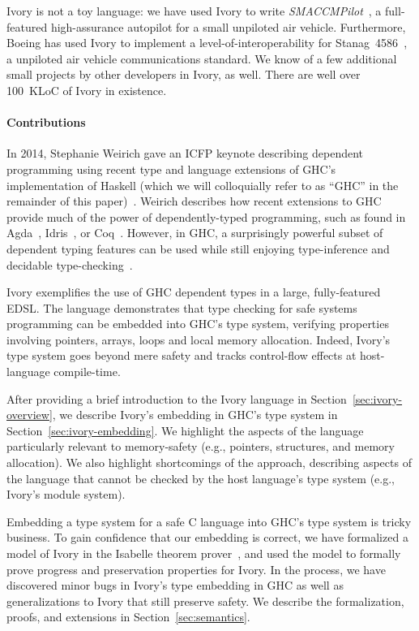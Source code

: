 
Ivory is not a toy language: we have used Ivory to write
\emph{SMACCMPilot}~\cite{smaccm}, a full-featured high-assurance
autopilot for a small unpiloted air vehicle.  Furthermore, Boeing has
used Ivory to implement a level-of-interoperability for
Stanag~4586~\cite{stanag}, a unpiloted air vehicle communications
standard. We know of a few additional small projects by other
developers in Ivory, as well.  There are well over 100~KLoC of Ivory in existence.

\paragraph{Contributions}
In 2014, Stephanie Weirich gave an ICFP keynote describing dependent programming
using recent type and language extensions of GHC's implementation of Haskell
(which we will colloquially refer to as ``GHC'' in the remainder of this
paper)~\cite{weirich-keynote}. Weirich describes how recent extensions to GHC
provide much of the power of dependently-typed programming, such as found in
Agda~\cite{agda}, Idris~\cite{idris}, or Coq~\cite{coq}. However, in GHC, a
surprisingly powerful subset of dependent typing features can be used while
still enjoying type-inference and decidable type-checking~\cite{dephaskell}.

Ivory exemplifies the use of GHC dependent types in a large, fully-featured
EDSL. The language demonstrates that type checking for safe systems programming
can be embedded into GHC's type system, verifying properties involving
pointers, arrays, loops and local memory allocation. Indeed, Ivory's type
system goes beyond mere safety and tracks control-flow effects at host-language
compile-time.

After providing a brief introduction to the Ivory language in
Section~\ref{sec:ivory-overview}, we describe Ivory's embedding in GHC's type
system in Section~\ref{sec:ivory-embedding}. We highlight the aspects of the
language particularly relevant to memory-safety (e.g., pointers, structures, and
memory allocation). We also highlight shortcomings of the approach, describing
aspects of the language that cannot be checked by the host language's type
system (e.g., Ivory's module system).

Embedding a type system for a safe C language into GHC's type system is tricky
business. To gain confidence that our embedding is correct, we have formalized a
model of Ivory in the Isabelle theorem prover~\cite{isabelle}, and used the model to
formally prove progress and preservation properties for Ivory. In the process,
we have discovered minor bugs in Ivory's type embedding in GHC as well as
generalizations to Ivory that still preserve safety. We describe the
formalization, proofs, and extensions in Section~\ref{sec:semantics}.

